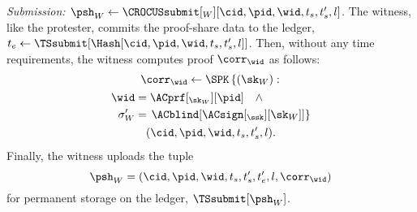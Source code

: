 \emph{Submission: \(\psh_W\gets \CROCUSsubmit[_W][\cid, \pid, \wid, t_s, t_s', 
    l]\).}
The witness, like the protester, commits the proof-share data to the 
ledger, \(t_e\gets \TSsubmit[\Hash[\cid, \pid, \wid, t_s, t_s', l]]\).
Then, without any time requirements, the witness computes  proof 
\(\corr_{\wid}\) as follows:
\begin{multline*}
  \corr_{\wid}\gets \SPK\left\{ (\sk_W) : \right. \\
    \begin{aligned}
      \wid &= \ACprf[_{\sk_W}][\pid] \quad \land \\
      \sigma_W' &= \left. \ACblind[\ACsign[_{\ssk}][\sk_W]] \right\}
    \end{aligned} \\
      (\cid, \pid, \wid, t_s, t_s', l).
\end{multline*}
Finally, the witness uploads the tuple \[
  \psh_W = (\cid, \pid, \wid, t_s, t_s', t_e', l, \corr_{\wid})
\] for permanent storage on the ledger, \(\TSsubmit[\psh_W]\).


